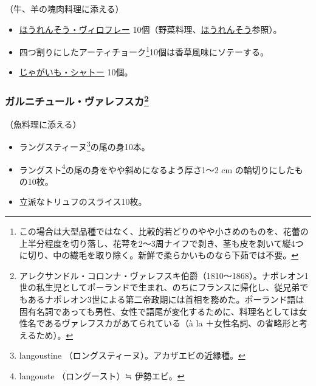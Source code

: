 \begin{recette}


（牛、羊の塊肉料理に添える）

\begin{itemize}
\item
  \protect\hyperlink{epinards-viroflay}{ほうれんそう・ヴィロフレー}
  10個（野菜料理、\protect\hyperlink{epinards}{ほうれんそう}参照）。
\item
  四つ割りにしたアーティチョーク\footnote{この場合は大型品種ではなく、比較的若どりのやや小さめのものを、花蕾の上半分程度を切り落し、花萼を2〜3周ナイフで剥き、茎も皮を剥いて縦4つに切り、中の繊毛を取り除く。新鮮で柔らかいものなら下茹では不要。}10個は香草風味にソテーする。
\item
  \protect\hyperlink{pommes-de-terre-chateau}{じゃがいも・シャトー}
  10個。
\end{itemize}

\atoaki{}

\hypertarget{garniture-Walewska}{%
\subsubsection[ガルニチュール・ヴァレフスカ]{\texorpdfstring{ガルニチュール・ヴァレフスカ\footnote{アレクサンドル・コロンナ・ヴァレフスキ伯爵（1810〜1868）。ナポレオン1世の私生児としてポーランドで生まれ、のちにフランスに帰化し、従兄弟でもあるナポレオン3世による第二帝政期には首相を務めた。ポーランド語は固有名詞であっても男性、女性で語尾が変化するために、料理名としては女性名であるヴァレフスカがあてられている（à
  la ＋女性名詞、の省略形と考えるため）。}}{ガルニチュール・ヴァレフスカ}}\label{garniture-Walewska}}



（魚料理に添える）

\begin{itemize}
\item
  ラングスティーヌ\footnote{langoustine
    （ロングスティーヌ）。アカザエビの近縁種。}の尾の身10本。
\item
  ラングスト\footnote{langouste （ロングースト）≒ 伊勢エビ。}の尾の身をやや斜めになるよう厚さ1〜2
  cm の輪切りにしたもの10枚。
\item
  立派なトリュフのスライス10枚。
\end{itemize}


\end{recette}
